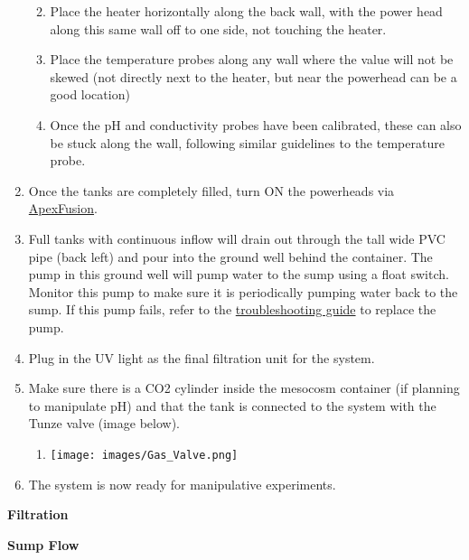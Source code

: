 \documentclass[
]{book}
\providecommand{\tightlist}{%
  \setlength{\itemsep}{0pt}\setlength{\parskip}{0pt}}
\begin{document}
\begin{enumerate}
  \begin{enumerate}
  \def\labelenumii{\arabic{enumii}.}
  \tightlist
  \item
    Place the heater horizontally along the back wall, with the power head along this same wall off to one side, not touching the heater.
  \item
    Place the temperature probes along any wall where the value will not be skewed (not directly next to the heater, but near the powerhead can be a good location)
  \item
    Once the pH and conductivity probes have been calibrated, these can also be stuck along the wall, following similar guidelines to the temperature probe.
  \end{enumerate}
\item
  Once the tanks are completely filled, turn ON the powerheads via \href{apexfusion.com}{ApexFusion}.
\item
  Full tanks with continuous inflow will drain out through the tall wide PVC pipe (back left) and pour into the ground well behind the container. The pump in this ground well will pump water to the sump using a float switch. Monitor this pump to make sure it is periodically pumping water back to the sump. If this pump fails, refer to the \href{14-troubleshooting_guide.rmd}{troubleshooting guide} to replace the pump.
\item
  Plug in the UV light as the final filtration unit for the system.
\item
  Make sure there is a CO2 cylinder inside the mesocosm container (if planning to manipulate pH) and that the tank is connected to the system with the Tunze valve (image below).

  \begin{enumerate}
  \def\labelenumii{\arabic{enumii}.}
  \tightlist
  \item
    \texttt{[image: images/Gas\_Valve.png]}
  \end{enumerate}
\item
  The system is now ready for manipulative experiments.
\end{enumerate}

\textbf{Filtration}

\textbf{Sump Flow}
\end{document}
